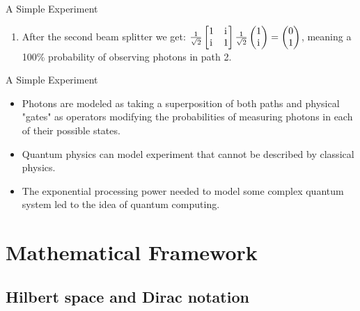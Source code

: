 \documentclass[svgnames,smaller,aspectratio=169]{beamer}
\begin{document}
\begin{frame}[fragile]{A Simple Experiment}
\begin{enumerate}
  \item After the second beam splitter we get: $\frac{1}{\sqrt{2}}\begin{bmatrix} 1 & \mathrm{i}\mkern1mu \\ \mathrm{i}\mkern1mu & 1 \end{bmatrix}
    \frac{1}{\sqrt{2}} \begin{pmatrix} 1 \\ \mathrm{i}\mkern1mu \end{pmatrix} = \begin{pmatrix} 0 \\ 1 \end{pmatrix}$, meaning a 100\%
    probability of observing photons in path 2.
  \end{enumerate}
\end{frame}

\begin{frame}[fragile]{A Simple Experiment \cite{interfer}}
  \begin{itemize}
  \item Photons are modeled as taking a superposition of both paths and physical "gates" as operators modifying the
    probabilities of measuring photons in each of their possible states.
  \end{itemize}
  \begin{itemize}
  \item Quantum physics can model experiment that cannot be described by classical physics.
  \item The exponential processing power needed to model some complex quantum system led to the idea of quantum
    computing.
  \end{itemize}
\end{frame}
  
\section{Mathematical Framework}

\subsection{Hilbert space and Dirac notation}
\end{document}
